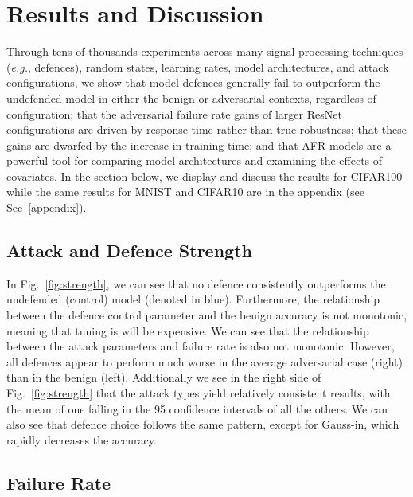 \section{Results and Discussion}
\label{results}

Through tens of thousands experiments across many signal-processing techniques (\textit{e.g.}, defences), random states, learning rates, model architectures, and attack configurations, we show that model defences generally fail to outperform the undefended model in either the benign or adversarial contexts, regardless of configuration; that the adversarial failure rate gains of larger ResNet configurations are driven by response time rather than true robustness; that these gains are dwarfed by the increase in training time; and that AFR models are a powerful tool for comparing model architectures and examining the effects of covariates. In the section below, we display and discuss the results for CIFAR100 while the same results for MNIST and CIFAR10 are in the appendix (see Sec~\ref{appendix}).



\subsection{Attack and Defence Strength}




In Fig.~\ref{fig:strength}, we can see that no defence consistently outperforms the undefended (control) model (denoted in blue). Furthermore, the relationship between the defence control parameter and the benign accuracy is not monotonic, meaning that tuning is will be expensive. We can see that the relationship between the attack parameters and failure rate is also not monotonic. However, all defences appear to perform much worse in the average adversarial case (right) than in the benign (left). Additionally we see in the right side of Fig.~\ref{fig:strength} that the attack types yield relatively consistent results, with the mean of one falling in the 95 confidence intervals of all the others. We can also see that defence choice follows the same pattern, except for Gauss-in, which rapidly decreases the accuracy.


\subsection{Failure Rate}


